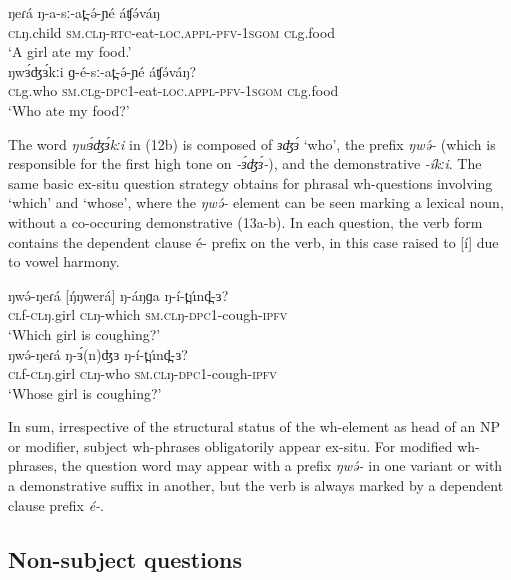 \ea
\ea \gll	ŋeɾá       	ŋ-a-sː-at̪-ə́-ɲé	áʧə́váŋ	\\
\textsc{cl}ŋ.child	\textsc{sm.cl}ŋ-\textsc{rtc}-eat-\textsc{loc}.\textsc{appl}-\textsc{pfv}-1\textsc{sgom}	\textsc{cl}g.food  \\
\trans ‘A girl ate my food.’\\
\ex \gll	ŋwɜ́ʤɜ́kːi   ɡ-é-sː-at̪-ə́-ɲé	áʧə́váŋ?	\\
\textsc{cl}g.who	\textsc{sm.cl}g-\textsc{dpc}1-eat-\textsc{loc}.\textsc{appl}-\textsc{pfv}-1\textsc{sgom}	\textsc{cl}g.food  \\
\trans ‘Who ate my food?’\\
\z
\z

The word \textit{ŋwɜ́ʤɜ́kːi} in (12b) is composed of \textit{ɜʤɜ́} ‘who’, the prefix \textit{ŋwə́-} (which is responsible for the first high tone on \textit{-ɜ́ʤɜ́-}), and the demonstrative \textit{-íkːi}. 
The same basic ex-situ question strategy obtains for phrasal wh-questions involving ‘which’ and ‘whose’, where the \textit{ŋwə́-} element can be seen marking a lexical noun, without a co-occuring demonstrative (13a-b). In each question, the verb form contains the dependent clause é- prefix on the verb, in this case raised to [í] due to vowel harmony. 

\ea
\ea \gll	 	ŋwə́-ŋeɾá  [ŋ́ŋwerá]	ŋ-áŋɡa	ŋ-í-t̪únd̪-ɜ?\\
		\textsc{cl}f-\textsc{cl}ŋ.girl	\textsc{cl}ŋ-which	\textsc{sm.cl}ŋ-\textsc{dpc}1-cough-\textsc{ipfv}\\
\trans		‘Which girl is coughing?’\\
\ex \gll	ŋwə́-ŋeɾá	ŋ-ɜ́(n)ʤɜ	ŋ-í-t̪únd̪-ɜ?\\	            
		\textsc{cl}f-\textsc{cl}ŋ.girl	\textsc{cl}ŋ-who	\textsc{sm.cl}ŋ-\textsc{dpc}1-cough-\textsc{ipfv}\\
\trans		‘Whose girl is coughing?’\\
\z
\z

In sum, irrespective of the structural status of the wh-element as head of an NP or modifier, subject wh-phrases obligatorily appear ex-situ. For modified wh-phrases, the question word may appear with a prefix \textit{ŋwə́-} in one variant or with a demonstrative suffix in another, but the verb is always marked by a dependent clause prefix \textit{é-}. 

\subsection{Non-subject questions}

